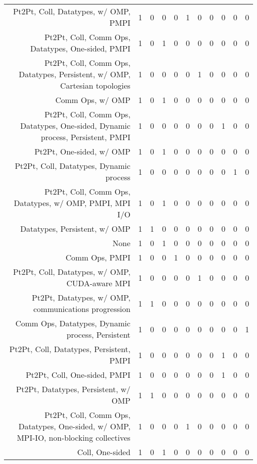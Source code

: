 {\begin{landscape}
\begin{longtable}[htb]{r|c|c|c|c|c|c|c|c|c|c}
{Pt2Pt, Coll, Datatypes, w/ OMP, PMPI} & 1 & 0 & 0 & 0 & 1 & 0 & 0 & 0 & 0 & 0 \\%
{Pt2Pt, Coll, Comm Ops, Datatypes, One-sided, PMPI} & 1 & 0 & 1 & 0 & 0 & 0 & 0 & 0 & 0 & 0 \\%
{Pt2Pt, Coll, Comm Ops, Datatypes, Persistent, w/ OMP, Cartesian topologies} & 1 & 0 & 0 & 0 & 0 & 1 & 0 & 0 & 0 & 0 \\%
{Comm Ops, w/ OMP} & 1 & 0 & 1 & 0 & 0 & 0 & 0 & 0 & 0 & 0 \\%
{Pt2Pt, Coll, Comm Ops, Datatypes, One-sided, Dynamic process, Persistent, PMPI} & 1 & 0 & 0 & 0 & 0 & 0 & 0 & 1 & 0 & 0 \\%
{Pt2Pt, One-sided, w/ OMP} & 1 & 0 & 1 & 0 & 0 & 0 & 0 & 0 & 0 & 0 \\%
{Pt2Pt, Coll, Datatypes, Dynamic process} & 1 & 0 & 0 & 0 & 0 & 0 & 0 & 0 & 1 & 0 \\%
{Pt2Pt, Coll, Comm Ops, Datatypes, w/ OMP, PMPI, MPI I/O} & 1 & 0 & 1 & 0 & 0 & 0 & 0 & 0 & 0 & 0 \\%
{Datatypes, Persistent, w/ OMP} & 1 & 1 & 0 & 0 & 0 & 0 & 0 & 0 & 0 & 0 \\%
{None} & 1 & 0 & 1 & 0 & 0 & 0 & 0 & 0 & 0 & 0 \\%
{Comm Ops, PMPI} & 1 & 0 & 0 & 1 & 0 & 0 & 0 & 0 & 0 & 0 \\%
{Pt2Pt, Coll, Datatypes, w/ OMP, CUDA-aware MPI} & 1 & 0 & 0 & 0 & 0 & 1 & 0 & 0 & 0 & 0 \\%
{Pt2Pt, Datatypes, w/ OMP, communications progression} & 1 & 1 & 0 & 0 & 0 & 0 & 0 & 0 & 0 & 0 \\%
{Comm Ops, Datatypes, Dynamic process, Persistent} & 1 & 0 & 0 & 0 & 0 & 0 & 0 & 0 & 0 & 1 \\%
{Pt2Pt, Coll, Datatypes, Persistent, PMPI} & 1 & 0 & 0 & 0 & 0 & 0 & 0 & 1 & 0 & 0 \\%
{Pt2Pt, Coll, One-sided, PMPI} & 1 & 0 & 0 & 0 & 0 & 0 & 0 & 1 & 0 & 0 \\%
{Pt2Pt, Datatypes, Persistent, w/ OMP} & 1 & 1 & 0 & 0 & 0 & 0 & 0 & 0 & 0 & 0 \\%
{Pt2Pt, Coll, Comm Ops, Datatypes, One-sided, w/ OMP, MPI-IO, non-blocking collectives} & 1 & 0 & 0 & 0 & 1 & 0 & 0 & 0 & 0 & 0 \\%
{Coll, One-sided} & 1 & 0 & 1 & 0 & 0 & 0 & 0 & 0 & 0 & 0 \\%
\hline%
\end{longtable}%
\end{landscape}}%
\clearpage%
